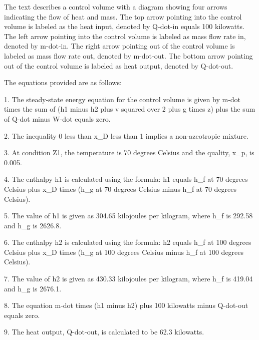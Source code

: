 The text describes a control volume with a diagram showing four arrows indicating the flow of heat and mass. The top arrow pointing into the control volume is labeled as the heat input, denoted by Q-dot-in equals 100 kilowatts. The left arrow pointing into the control volume is labeled as mass flow rate in, denoted by m-dot-in. The right arrow pointing out of the control volume is labeled as mass flow rate out, denoted by m-dot-out. The bottom arrow pointing out of the control volume is labeled as heat output, denoted by Q-dot-out.

The equations provided are as follows:

1. The steady-state energy equation for the control volume is given by m-dot times the sum of (h1 minus h2 plus v squared over 2 plus g times z) plus the sum of Q-dot minus W-dot equals zero.

2. The inequality 0 less than x_D less than 1 implies a non-azeotropic mixture.

3. At condition Z1, the temperature is 70 degrees Celsius and the quality, x_p, is 0.005.

4. The enthalpy h1 is calculated using the formula: h1 equals h_f at 70 degrees Celsius plus x_D times (h_g at 70 degrees Celsius minus h_f at 70 degrees Celsius).

5. The value of h1 is given as 304.65 kilojoules per kilogram, where h_f is 292.58 and h_g is 2626.8.

6. The enthalpy h2 is calculated using the formula: h2 equals h_f at 100 degrees Celsius plus x_D times (h_g at 100 degrees Celsius minus h_f at 100 degrees Celsius).

7. The value of h2 is given as 430.33 kilojoules per kilogram, where h_f is 419.04 and h_g is 2676.1.

8. The equation m-dot times (h1 minus h2) plus 100 kilowatts minus Q-dot-out equals zero.

9. The heat output, Q-dot-out, is calculated to be 62.3 kilowatts.